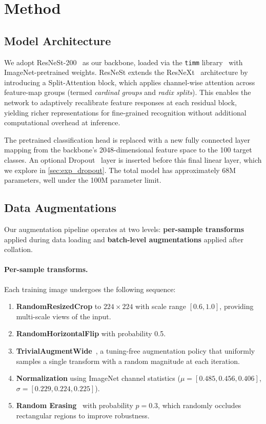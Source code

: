 \documentclass[10pt,twocolumn,letterpaper]{article}
\begin{document}
\section{Method}
\label{sec:method}

\subsection{Model Architecture}
\label{sec:arch}

We adopt ResNeSt-200~\cite{zhang2022resnest} as our backbone, loaded via the \texttt{timm} library~\cite{rw2019timm} with ImageNet-pretrained weights. ResNeSt extends the ResNeXt~\cite{xie2017resnext} architecture by introducing a Split-Attention block, which applies channel-wise attention across feature-map groups (termed \textit{cardinal groups} and \textit{radix splits}). This enables the network to adaptively recalibrate feature responses at each residual block, yielding richer representations for fine-grained recognition without additional computational overhead at inference.

The pretrained classification head is replaced with a new fully connected layer mapping from the backbone's 2048-dimensional feature space to the 100 target classes. An optional Dropout~\cite{srivastava2014dropout} layer is inserted before this final linear layer, which we explore in \cref{sec:exp_dropout}. The total model has approximately 68M parameters, well under the 100M parameter limit.

\subsection{Data Augmentations}
\label{sec:aug}

Our augmentation pipeline operates at two levels: \textbf{per-sample transforms} applied during data loading and \textbf{batch-level augmentations} applied after collation.

\paragraph{Per-sample transforms.} Each training image undergoes the following sequence:
\begin{enumerate}
	\item \textbf{RandomResizedCrop} to $224 \times 224$ with scale range $[0.6, 1.0]$, providing multi-scale views of the input.
	\item \textbf{RandomHorizontalFlip} with probability 0.5.
	\item \textbf{TrivialAugmentWide}~\cite{muller2021trivialaugment}, a tuning-free augmentation policy that uniformly samples a single transform with a random magnitude at each iteration.
	\item \textbf{Normalization} using ImageNet channel statistics ($\mu = [0.485, 0.456, 0.406]$, $\sigma = [0.229, 0.224, 0.225]$).
	\item \textbf{Random Erasing}~\cite{zhong2020random_erasing} with probability $p = 0.3$, which randomly occludes rectangular regions to improve robustness.
\end{enumerate}
\end{document}
